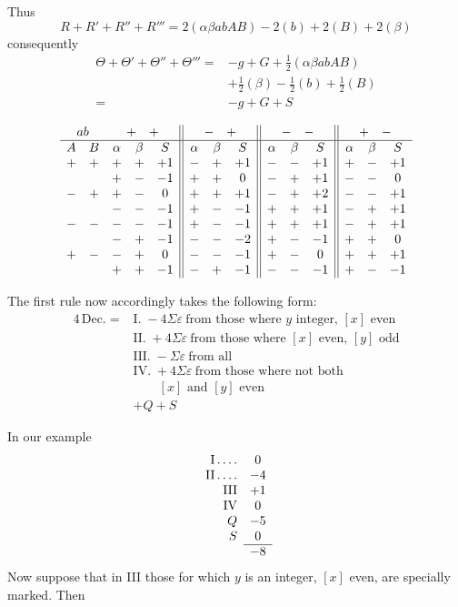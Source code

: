 Thus
\[
R+R'+R''+R'''=2(\alpha\beta abAB)-2(b)+2(B)+2(\beta)
\]
consequently
\[
\begin{aligned}
\Theta+\Theta'+\Theta''+\Theta'''={}&-g+G+\tfrac12(\alpha\beta abAB)\\
&+\tfrac12(\beta)-\tfrac12(b)+\tfrac12(B)\\
={}&-g+G+S
\end{aligned}
\]

\begingroup\small\setlength{\arraycolsep}{2.6pt}
\[
\begin{array}{ccccc||ccc||ccc||ccc}
\multicolumn{2}{c}{ab}&\multicolumn{3}{c||}{+\quad+}&\multicolumn{3}{c||}{-\quad+}&\multicolumn{3}{c||}{-\quad-}&\multicolumn{3}{c}{+\quad-}\\\hline
A&B&\alpha&\beta&S&\alpha&\beta&S&\alpha&\beta&S&\alpha&\beta&S\\
+&+&+&+&+1&-&+&+1&-&-&+1&+&-&+1\\
&&+&-&-1&+&+&0&-&+&+1&-&-&0\\
-&+&+&-&0&+&+&+1&-&+&+2&-&-&+1\\
&&-&-&-1&+&-&-1&+&+&+1&-&+&+1\\
-&-&-&-&-1&+&-&-1&+&+&+1&-&+&+1\\
&&-&+&-1&-&-&-2&+&-&-1&+&+&0\\
+&-&-&+&0&-&-&-1&+&-&0&+&+&+1\\
&&+&+&-1&-&+&-1&-&-&-1&+&-&-1\\
\end{array}
\]
\endgroup

The first rule now accordingly takes the following form:
\[
\begin{aligned}
4\,\text{Dec.}={}&\text{I.}\;-4\Sigma\varepsilon\ \text{from those where }y\text{ integer, }[x]\text{ even}\\
&\text{II.}\;+4\Sigma\varepsilon\ \text{from those where }[x]\text{ even, }[y]\text{ odd}\\
&\text{III.}\;-\Sigma\varepsilon\ \text{from all}\\
&\text{IV.}\;+4\Sigma\varepsilon\ \text{from those where not both}\\
&\qquad [x]\text{ and }[y]\text{ even}\\
&+Q+S
\end{aligned}
\]

In our example
\[
\begin{array}{rc}
\mathrm{I}\dotsfour&0\\
\mathrm{II}\dotsfour&-4\\
\mathrm{III}&+1\\
\mathrm{IV}&0\\
Q&-5\\
S&0\\\cline{2-2}
&-8
\end{array}
\]
Now suppose that in III those for which $y$ is an integer, $[x]$ even, are specially marked. Then

